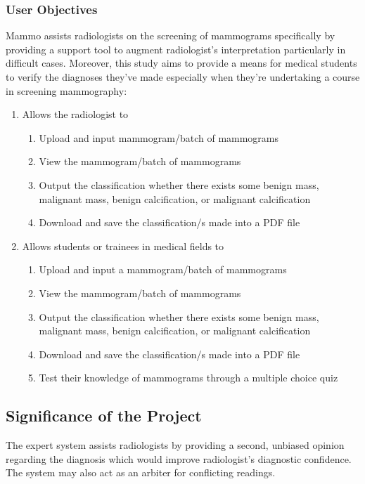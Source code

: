 \subsubsection{User Objectives}
	Mammo assists radiologists on the screening of mammograms specifically by providing a support tool to augment radiologist's interpretation particularly in difficult cases. Moreover, this study aims to provide a means for medical students to verify the diagnoses they've made especially when they're undertaking a course in screening mammography:

\begin{enumerate}
	\item Allows the radiologist to
	\begin{enumerate}
		\item Upload and input mammogram/batch of mammograms
		\item View the mammogram/batch of mammograms
		\item Output the classification whether there exists some benign mass, malignant mass, benign calcification, or malignant calcification
		\item Download and save the classification/s made into a PDF file
	\end{enumerate}
	\item Allows students or trainees in medical fields to
	\begin{enumerate}
		\item Upload and input a mammogram/batch of mammograms
		\item View the mammogram/batch of mammograms
		\item Output the classification whether there exists some benign mass, malignant mass, benign calcification, or malignant calcification
		\item Download and save the classification/s made into a PDF file
		\item Test their knowledge of mammograms through a multiple choice quiz
	\end{enumerate}
\end{enumerate}

\subsection{Significance of the Project}
\qquad The expert system assists radiologists by providing a second, unbiased opinion regarding the diagnosis which would improve radiologist's diagnostic confidence. The system may also act as an arbiter for conflicting readings.

